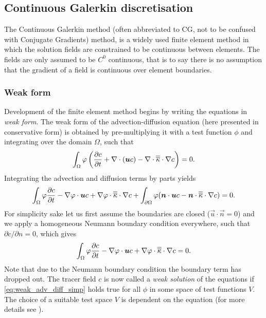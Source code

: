 \subsection{Continuous Galerkin discretisation}
\label{sec:ND_advection_diffusion_CG}

The Continuous Galerkin method (often abbreviated to CG, 
not to be confused with Conjugate Gradients) method,
is a widely used finite element method in which 
the solution fields are constrained to be
continuous between elements. 
The fields are only assumed to be $C^0$
continuous, that is to say there is no assumption that the gradient of a
field is continuous over element boundaries.

\subsubsection{Weak form}

Development of the finite element method begins by writing the equations in
\emph{weak form}.  The weak form of the advection-diffusion equation 
(here presented in conservative form) is
obtained by pre-multiplying it with a test function $\phi$
and integrating over the domain $\Omega$, such that
\begin{equation}
  \int_\Omega \varphi \left( \frac{\partial c}{\partial t} + \nabla\cdot({\mbox{\boldmath$u$}} c) -
    \nabla\cdot\overline{\overline{\kappa}}\cdot \nabla c\right) = 0.
\end{equation}
Integrating the advection and diffusion terms by parts yields
\begin{equation}\label{eq:weak_adv_diff}
  \int_\Omega
  \varphi \frac{\partial c}{\partial t}
  -\nabla\varphi\cdot{\mbox{\boldmath$u$}} c +
  \nabla\varphi\cdot \overline{\overline{\kappa}}\cdot\nabla c
  +\int_{\partial\Omega} \varphi({\mbox{\boldmath$n$}}\cdot {\mbox{\boldmath$u$}} c
  - {\mbox{\boldmath$n$}}\cdot\overline{\overline{\kappa}}\cdot\nabla c)
  = 0.
\end{equation}
For simplicity sake let us first assume the boundaries are closed
($\vec{u}\cdot\vec{n}=0$) and we apply a homogeneous Neumann boundary
condition everywhere, such that $\partial c/\partial n=0$, which gives
\begin{equation}\label{eq:weak_adv_diff_simp}
  \int_\Omega \varphi \frac{\partial c}{\partial t}
    -\nabla\varphi\cdot{\mbox{\boldmath$u$}} c +
    \nabla\varphi\cdot \overline{\overline{\kappa}}\cdot\nabla c = 0.
\end{equation}
Note that due to the Neumann boundary condition the boundary term has
dropped out. The tracer field $c$ is now called a \emph{weak solution} of
the equations if \eqref{eq:weak_adv_diff_simp} holds true for all $\phi$ in some
space of test functions $V$. The choice of a suitable test space $V$ is dependent
on the equation (for more details see \citet{elman2005}).

